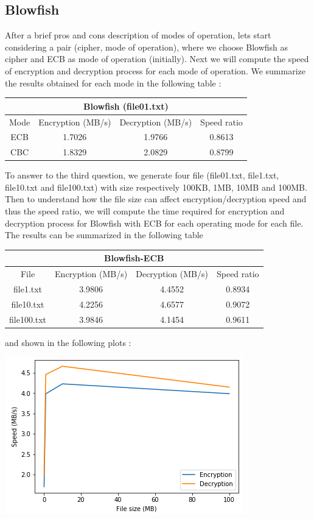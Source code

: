 \documentclass[11pt]{article}
\begin{document}
\subsection{Blowfish}
After a brief pros and cons description of modes of operation, lets start considering a pair (cipher, mode of operation), where we choose Blowfish as cipher and ECB as mode of operation (initially). Next we will compute the speed of encryption and decryption process for each mode of operation. We summarize the results obtained for each mode in the following table :
\begin{center}
\begin{tabular}{| c | c | c | c |}
\hline
\multicolumn{4}{|c|}{Blowfish (file01.txt)} \\
\hline
Mode & Encryption (MB/s) & Decryption (MB/s) & Speed ratio\\
\hline
ECB & 1.7026 & 1.9766 & 0.8613 \\
\hline
CBC & 1.8329 & 2.0829 & 0.8799 \\
\hline
\end{tabular}
\end{center}
To answer to the third question, we generate four file (file01.txt, file1.txt, file10.txt and file100.txt) with size respectively 100KB, 1MB, 10MB and 100MB. Then to understand how the file size can affect encryption/decryption speed and thus the speed ratio, we will compute the time required for encryption and decryption process for Blowfish with ECB for each operating mode for each file. The results can be summarized in the following table
\begin{center}
\begin{tabular}{| c | c | c | c |}
\hline
\multicolumn{4}{|c|}{Blowfish-ECB} \\
\hline
File & Encryption (MB/s) & Decryption (MB/s) & Speed ratio\\
\hline
file1.txt & 3.9806 & 4.4552 & 0.8934 \\
\hline
file10.txt & 4.2256 & 4.6577 & 0.9072 \\
\hline
file100.txt & 3.9846 & 4.1454 & 0.9611 \\
\hline
\end{tabular}
\end{center}
\pagebreak and shown in the following plots :
\begin{center}
\includegraphics[scale=0.5]{./enc_dec_speed_blowfish_ecb.png}
\end{center}
\end{document}
